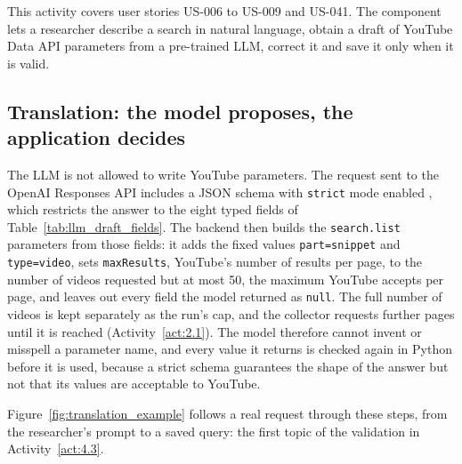 This activity covers user stories US-006 to US-009 and US-041. The component lets a researcher describe a search in natural language, obtain a draft of YouTube Data API parameters from a pre-trained LLM, correct it and save it only when it is valid.

\subsection{Translation: the model proposes, the application decides}

The LLM is not allowed to write YouTube parameters. The request sent to the OpenAI Responses API includes a JSON schema with \texttt{strict} mode enabled \autocite{openai_structured_outputs}, which restricts the answer to the eight typed fields of Table~\ref{tab:llm_draft_fields}. The backend then builds the \texttt{search.\allowbreak list} parameters from those fields: it adds the fixed values \texttt{part=snippet} and \texttt{type=video}, sets \texttt{maxResults}, YouTube's number of results per page, to the number of videos requested but at most 50, the maximum YouTube accepts per page, and leaves out every field the model returned as \texttt{null}. The full number of videos is kept separately as the run's cap, and the collector requests further pages until it is reached (Activity~\ref{act:2.1}). The model therefore cannot invent or misspell a parameter name, and every value it returns is checked again in Python before it is used, because a strict schema guarantees the shape of the answer but not that its values are acceptable to YouTube.

Figure~\ref{fig:translation_example} follows a real request through these steps, from the researcher's prompt to a saved query: the first topic of the validation in Activity~\ref{act:4.3}.

